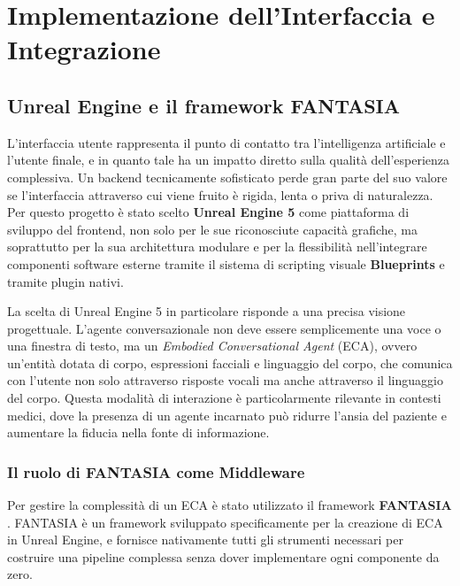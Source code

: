\newpage\pagestyle{main}

\chapter{Implementazione dell'Interfaccia e Integrazione}\label{chap:fourth}

\inlineminitoc

\section{Unreal Engine e il framework FANTASIA}

L'interfaccia utente rappresenta il punto di contatto tra l'intelligenza artificiale e l'utente finale, e in quanto tale ha un impatto diretto sulla qualità dell'esperienza complessiva. Un backend tecnicamente sofisticato perde gran parte del suo valore se l'interfaccia attraverso cui viene fruito è rigida, lenta o priva di naturalezza. Per questo progetto è stato scelto \textbf{Unreal Engine 5} \cite{ue} come piattaforma di sviluppo del frontend, non solo per le sue riconosciute capacità grafiche, ma soprattutto per la sua architettura modulare e per la flessibilità nell'integrare componenti software esterne tramite il sistema di scripting visuale \textbf{Blueprints} e tramite plugin nativi.

La scelta di Unreal Engine 5 in particolare risponde a una precisa visione progettuale. L'agente conversazionale non deve essere semplicemente una voce o una finestra di testo, ma un \textit{Embodied Conversational Agent} (ECA), ovvero un'entità dotata di corpo, espressioni facciali e linguaggio del corpo, che comunica con l'utente non solo attraverso risposte vocali ma anche attraverso il linguaggio del corpo. Questa modalità di interazione è particolarmente rilevante in contesti medici, dove la presenza di un agente incarnato può ridurre l'ansia del paziente e aumentare la fiducia nella fonte di informazione.

\subsection{Il ruolo di FANTASIA come Middleware}

Per gestire la complessità di un ECA è stato utilizzato il framework \textbf{FANTASIA} \cite{fantasia1, fantasia2}. FANTASIA è un framework sviluppato specificamente per la creazione di ECA in Unreal Engine, e fornisce nativamente tutti gli strumenti necessari per costruire una pipeline complessa senza dover implementare ogni componente da zero.

